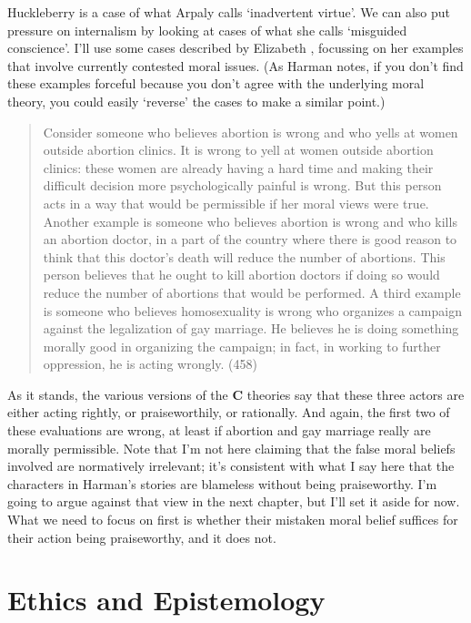 \gls{Huck}leberry is a case of what Arpaly calls `inadvertent virtue'. We can also put pressure on internalism by looking at cases of what she calls `misguided conscience'. I'll use some cases described by Elizabeth \citet{Harman2011a}, focussing on her examples that involve currently contested moral issues. (As Harman notes, if you don't find these examples forceful because you don't agree with the underlying moral theory, you could easily `reverse' the cases to make a similar point.)

\begin{quote}
Consider someone who believes abortion is wrong and who yells at women outside abortion clinics. It is wrong to yell at women outside abortion clinics: these women are already having a hard time and making their difficult decision more psychologically painful is wrong. But this person acts in a way that would be permissible if her moral views were true. Another example is someone who believes abortion is wrong and who kills an abortion doctor, in a part of the country where there is good reason to think that this doctor's death will reduce the number of abortions. This person believes that he ought to kill abortion doctors if doing so would reduce the number of abortions that would be performed. A third example is someone who believes homosexuality is wrong who organizes a campaign against the legalization of gay marriage. He believes he is doing something morally good in organizing the campaign; in fact, in working to further oppression, he is acting wrongly. (458)
\end{quote}
As it stands, the various versions of the \textbf{C} theories say that these three actors are either acting rightly, or praiseworthily, or rationally. And again, the first two of these evaluations are wrong, at least if abortion and gay marriage really are morally permissible. Note that I'm not here claiming that the false moral beliefs involved are normatively irrelevant; it's consistent with what I say here that the characters in Harman's stories are blameless without being praiseworthy. I'm going to argue against that view in the next chapter, but I'll set it aside for now. What we need to focus on first is whether their mistaken moral belief suffices for their action being praiseworthy, and it does not.

\section{Ethics and Epistemology}
\label{ethicsandepistemology}

